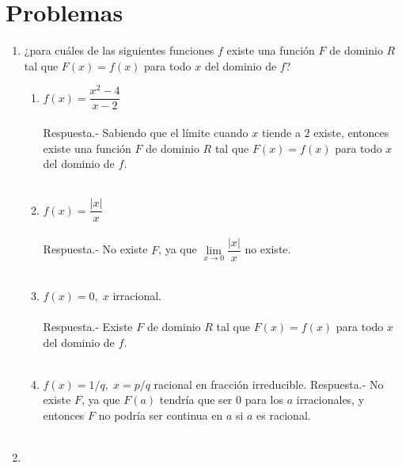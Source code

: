 \section{Problemas}
\begin{enumerate}

\item ¿para cuáles de las siguientes funciones $f$ existe una función $F$ de dominio $R$ tal que $F(x)=f(x)$ para todo $x$ del dominio de $f$?

    \begin{enumerate}

	\item $f(x) = \dfrac{x^2 - 4}{x - 2}$\\\\
	    Respuesta.-\; Sabiendo que el límite cuando $x$ tiende a $2$ existe, entonces existe una función $F$ de dominio $R$ tal que $F(x)=f(x)$ para todo $x$ del dominio de $f$.\\\\

	\item $f(x) = \dfrac{|x|}{x}$\\\\
	    Respuesta.-\; No existe $F$, ya que $\lim\limits_{x\to 0} \dfrac{|x|}{x}$ no existe.\\\\

	\item $f(x) = 0,\; x$ irracional.\\\\
	    Respuesta.-\; Existe $F$ de dominio $R$ tal que $F(x)=f(x)$ para todo $x$ del dominio de $f$.\\\\

	\item $f(x) = 1/q, \; x = p/q$ racional en fracción irreducible.
	    Respuesta.-\; No existe $F$, ya que $F(a)$ tendría que ser $0$ para los $a$ irracionales, y entonces $F$ no podría ser continua en $a$ si $a$ es racional.\\\\

    \end{enumerate}

\item 


\end{enumerate}
